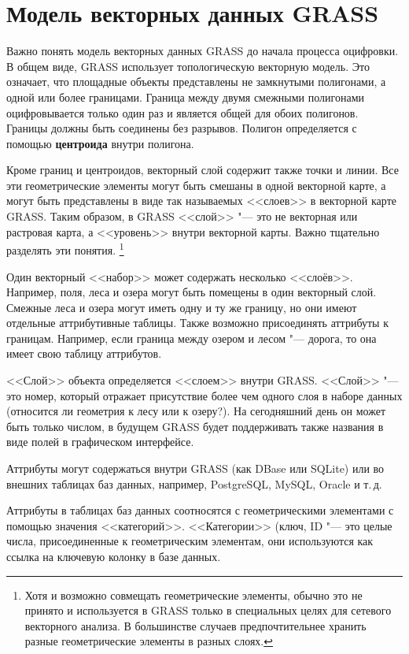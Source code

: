 \section{Модель векторных данных GRASS}\label{label_vectmodel}

Важно понять модель векторных данных GRASS до начала процесса оцифровки.
В общем виде, GRASS использует топологическую векторную модель.
Это означает, что площадные объекты представлены не замкнутыми
полигонами, а одной или более границами. Граница между двумя смежными
полигонами оцифровывается только один раз и является общей для обоих
полигонов. Границы должны быть соединены без разрывов. Полигон
определяется с помощью \textbf{центроида} внутри полигона.

Кроме границ и центроидов, векторный слой содержит также точки и линии.
Все эти геометрические элементы могут быть смешаны в одной векторной
карте, а могут быть представлены в виде так называемых <<слоев>> в
векторной карте GRASS. Таким образом, в GRASS <<слой>> "--- это не
векторная или растровая карта, а <<уровень>> внутри векторной карты.
Важно тщательно разделять эти понятия.
\footnote{Хотя и возможно совмещать геометрические элементы, обычно это
не принято и используется в GRASS только в специальных целях для сетевого
векторного анализа. В большинстве случаев предпочтительнее хранить разные
геометрические элементы в разных слоях.}

Один векторный <<набор>> может содержать несколько <<слоёв>>. Например,
поля, леса и озера могут быть помещены в один векторный слой. Смежные
леса и озера могут иметь одну и ту же границу, но они имеют отдельные
аттрибутивные таблицы. Также возможно присоединять аттрибуты к границам.
Например, если граница между озером и лесом "--- дорога, то она имеет
свою таблицу аттрибутов.

<<Слой>> объекта определяется <<слоем>> внутри GRASS. <<Слой>> "--- это
номер, который отражает присутствие более чем одного слоя в наборе
данных (относится ли геометрия к лесу или к озеру?). На сегодняшний день
он может быть только числом, в будущем GRASS будет поддерживать также
названия в виде полей в графическом интерфейсе.

Аттрибуты могут содержаться внутри  GRASS (как DBase
или SQLite) или во внешних таблицах баз данных, например, PostgreSQL,
MySQL, Oracle и т.\,д.

Аттрибуты в таблицах баз данных соотносятся с геометрическими
элементами с помощью значения <<категорий>>.
<<Категории>> (ключ, ID "--- это целые числа, присоединенные к
геометрическим элементам, они используются как ссылка на ключевую
колонку в базе данных.

